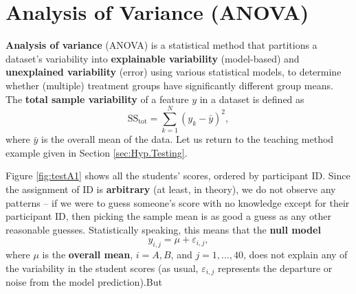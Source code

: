 \section{Analysis of Variance (ANOVA)}\label{sec:ANOVA}
\textbf{Analysis of variance} (ANOVA) is a statistical method that partitions a dataset's variability into \textbf{explainable variability} (model-based) and \textbf{unexplained variability} (error) using various statistical models, to determine whether (multiple) treatment groups have significantly different group means. 
\newl The \textbf{total sample variability} of a feature $y$ in a dataset is defined as
\begin{equation*}
    \text{SS}_{\textrm{tot}}=\sum_{k=1}^{N}(y_{k}-\bar{y})^{2},
\end{equation*}
where $\bar{y}$ is the overall mean of the data. 
\newl Let us return to the teaching method example given in Section \ref{sec:Hyp.Testing}. \par Figure \ref{fig:testA1} shows all the students' scores, ordered by participant ID. Since the assignment of ID is \textbf{arbitrary} (at least, in theory), we do not observe any patterns -- if we were to guess someone's score with no knowledge except for their participant ID, then picking the sample mean is as good a guess as any other reasonable guesses. \newl Statistically speaking, this means that the \textbf{null model}
\begin{equation*}
    y_{i,j}=\mu+\varepsilon_{i,j},
\end{equation*}
where $\mu$ is the \textbf{overall mean}, $i= {A,B}$, and $j=1,\ldots,40$, does not explain any of the variability in the student scores (as usual, $\varepsilon_{i,j}$ represents the departure or noise from the model prediction).\newl But 
